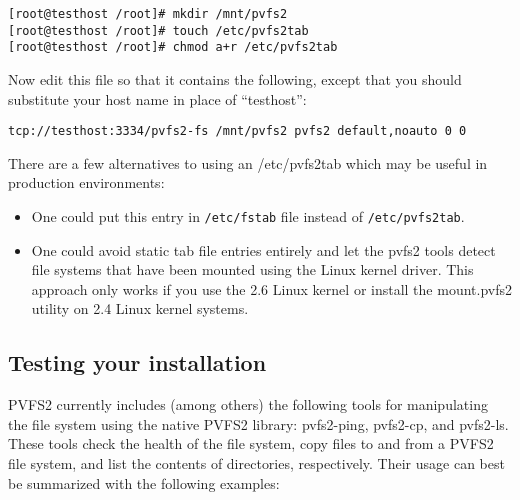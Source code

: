 \documentclass[11pt, letterpaper]{article}
\begin{document}
\begin{verbatim}
[root@testhost /root]# mkdir /mnt/pvfs2
[root@testhost /root]# touch /etc/pvfs2tab
[root@testhost /root]# chmod a+r /etc/pvfs2tab
\end{verbatim}

Now edit this file so that it contains the following, except that you should
substitute your host name in place of ``testhost'':

\begin{verbatim}
tcp://testhost:3334/pvfs2-fs /mnt/pvfs2 pvfs2 default,noauto 0 0 
\end{verbatim}

There are a few alternatives to using an /etc/pvfs2tab which may be useful
in production environments:
\begin{itemize}
\item One could put this entry in \texttt{/etc/fstab} file instead of
\texttt{/etc/pvfs2tab}. 
\item One could avoid static tab file entries entirely and let the pvfs2 tools
detect file systems that have been mounted using the Linux kernel
driver.  This approach only works if you use the 2.6 Linux kernel or
install the mount.pvfs2 utility on 2.4 Linux kernel systems.
\end{itemize}

\subsection{Testing your installation}
\label{subsec:testing}
PVFS2 currently includes (among others) the following tools for
manipulating the file system using the native PVFS2 library:
pvfs2-ping, pvfs2-cp, and pvfs2-ls.  These tools
check the health of the file system, copy files to and from a PVFS2 file system, and list the
contents of directories, respectively.  Their usage
can best be summarized with the following examples:
\end{document}
